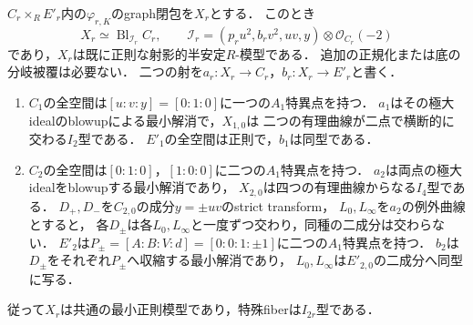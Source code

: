 \begin{theorem}[二traitのgraph閉包]
\label{thm:qa-boundary-graph-common-regular-model}
$C_r\times_R E'_r$内の$\varphi_{r,K}$のgraph閉包を$X_r$とする．
このとき
\[
 X_r\simeq\operatorname{Bl}_{\mathcal I_r}C_r,
 \qquad
 \mathcal I_r=(p_ru^2,b_rv^2,uv,y)\otimes\mathcal O_{C_r}(-2)
\]
であり，$X_r$は既に正則な射影的半安定$R$-模型である．
追加の正規化または底の分岐被覆は必要ない．
二つの射を$a_r:X_r\to C_r$，$b_r:X_r\to E'_r$と書く．
\begin{enumerate}
 \item $C_1$の全空間は$[u:v:y]=[0:1:0]$に一つの$A_1$特異点を持つ．
 $a_1$はその極大idealのblowupによる最小解消で，$X_{1,0}$は
 二つの有理曲線が二点で横断的に交わる$I_2$型である．
 $E'_1$の全空間は正則で，$b_1$は同型である．
 \item $C_2$の全空間は$[0:1:0]$，$[1:0:0]$に二つの$A_1$特異点を持つ．
 $a_2$は両点の極大idealをblowupする最小解消であり，
 $X_{2,0}$は四つの有理曲線からなる$I_4$型である．
 $D_+,D_-$を$C_{2,0}$の成分$y=\pm uv$のstrict transform，
 $L_0,L_\infty$を$a_2$の例外曲線とすると，
 各$D_\pm$は各$L_0,L_\infty$と一度ずつ交わり，同種の二成分は交わらない．
 $E'_2$は$P_\pm=[A:B:V:d]=[0:0:1:\pm1]$に二つの$A_1$特異点を持つ．
 $b_2$は$D_\pm$をそれぞれ$P_\pm$へ収縮する最小解消であり，
 $L_0,L_\infty$は$E'_{2,0}$の二成分へ同型に写る．
\end{enumerate}
従って$X_r$は共通の最小正則模型であり，特殊fiberは$I_{2r}$型である．
\end{theorem}

